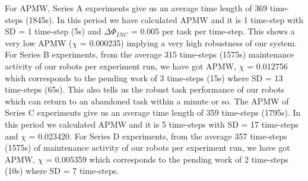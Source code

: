 \documentclass[journal]{IEEEtran}
\begin{document}
For APMW, Series A experiments give us an average time length of 369 time-steps (1845s).  In this period we have calculated APMW and it is 1 time-step with SD = 1 time-step (5s) and $\Delta \Phi_{INC}$ = 0.005 per task per time-step. This shows a very low APMW ($\chi$ = 0.000235) implying a very high robustness of our system. For Series B experiments, from the average 315 time-steps (1575s) maintenance activity of our robots per experiment run, we have got APMW, $\chi$ = 0.012756 which corresponds to the pending work of 3 time-steps (15s) where SD = 13 time-steps (65s). This also tells us the robust task performance of our robots which can return to an abandoned task within a minute or so. The APMW of Series C experiments give us an average time length of 359 time-steps (1795s). In this period we calculated APMW and it is 5 time-steps with SD = 17 time-steps and $\chi$ = 0.023420. For Series D experiments, from the average 357 time-steps (1575s) of maintenance activity of our robots per experiment run, we have got APMW, $\chi$ = 0.005359 which corresponds to the pending work of 2 time-steps (10s) where SD = 7 time-steps.
\end{document}
